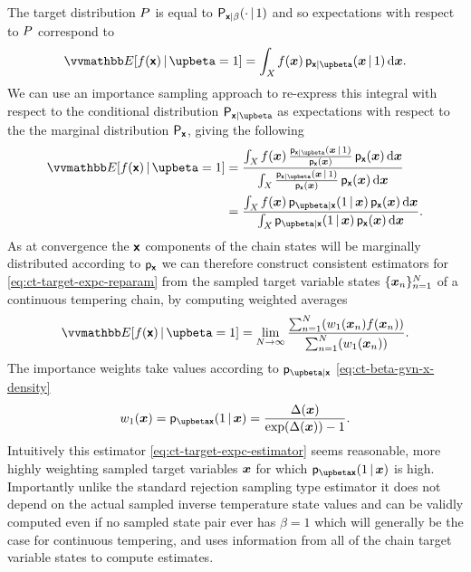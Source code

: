 The target distribution $P$ is equal to $\mathsf{P}_{\boldsymbol{\mathsf{x}}|\beta}(\cdot \operatorname{|} 1)$ and so expectations with respect to $P$ correspond to
\begin{equation}
\expc{f(\rvct{x})\gvn\upbeta=1} =
\int_{\set{X}} f(\vct{x})\,\pden{\rvct{x}|\upbeta}(\vct{x}\gvn 1)\,\dr\vct{x}.
\end{equation}
We can use an importance sampling approach to re-express this integral with respect to the conditional distribution $\prob{\rvct{x}|\upbeta}$ as expectations with respect to the the marginal distribution $\mathsf{P}_{\boldsymbol{\mathsf{x}}}$, giving the following
\begin{align}
\expc{f(\rvct{x})\gvn\upbeta=1} &=
\frac{
  \int_{\set{X}} 
    f(\vct{x})\, \frac{\pden{\rvct{x}|\upbeta}(\vct{x}\gvn 1)}{\pden{\rvct{x}}(\vct{x})} \, \pden{\rvct{x}}(\vct{x})
  \,\dr\vct{x}
}{
  \int_{\set{X}} 
    \frac{\pden{\rvct{x}|\upbeta}(\vct{x} \gvn 1)}{\pden{\rvct{x}}(\vct{x})} \, \pden{\rvct{x}}(\vct{x})
  \,\dr\vct{x}
} \\ \label{eq:ct-target-expc-reparam}
&=
\frac{
  \int_{\set{X}} 
    f(\vct{x})\, \pden{\upbeta|\rvct{x}}(1 \gvn \vct{x}) \, \pden{\rvct{x}}(\vct{x})
  \,\dr\vct{x}
}{
  \int_{\set{X}} 
    \pden{\upbeta|\rvct{x}}(1 \gvn \vct{x}) \, \pden{\rvct{x}}(\vct{x})
  \,\dr\vct{x}
} .
\end{align}
As at convergence the $\boldsymbol{\mathsf{x}}$ components of the chain states will be marginally distributed according to $\mathsf{p}_{\boldsymbol{\mathsf{x}}}$ we can therefore construct consistent estimators for \eqref{eq:ct-target-expc-reparam} from the sampled target variable states $\lbrace \boldsymbol{x}_n \rbrace_{n=1}^N$ of a continuous tempering chain, by computing weighted averages
\begin{equation}\label{eq:ct-target-expc-estimator}
\expc{f(\rvct{x})\gvn\upbeta=1} =
\lim_{N \to \infty}
\frac
{\sum_{n=1}^N \lpa w_1\lpa \vct{x}_n\rpa f\lpa\vct{x}_n\rpa\rpa}
{\sum_{n=1}^N\lpa w_1\lpa \vct{x}_n\rpa \rpa}.
\end{equation}
The importance weights take values according to $\pden{\upbeta|\rvct{x}}$ \eqref{eq:ct-beta-gvn-x-density}
\begin{equation}\label{eq:ct-target-expc-estimator-importance-weight}
w_1(\vct{x}) = \pden{\upbeta \rvct{x}}(1 \gvn \vct{x}) = \frac{\Delta(\vct{x})}{\exp\lpa\Delta(\vct{x})\rpa - 1}.
\end{equation}
Intuitively this estimator \eqref{eq:ct-target-expc-estimator} seems reasonable, more highly weighting sampled target variables $\boldsymbol{x}$ for which $\pden{\upbeta \rvct{x}}(1 \gvn \vct{x})$ is high. Importantly unlike the standard rejection sampling type estimator it does not depend on the actual sampled inverse temperature state values and can be validly computed even if no sampled state pair ever has $\beta = 1$ which will generally be the case for continuous tempering, and uses information from all of the chain target variable states to compute estimates.

